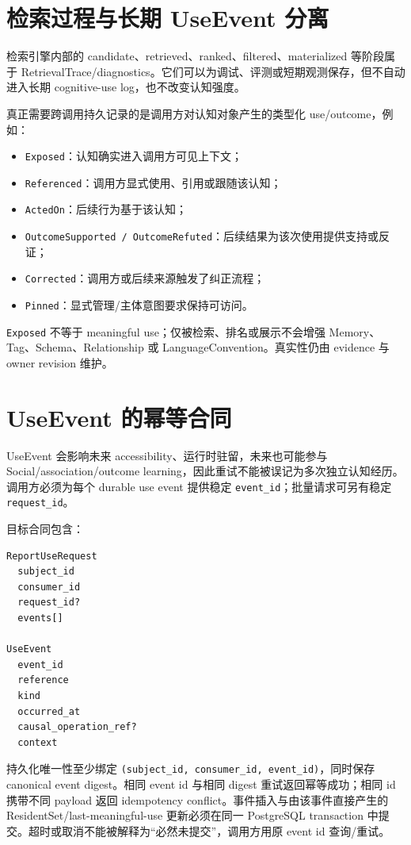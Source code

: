 \section{检索过程与长期 UseEvent 分离}

检索引擎内部的 candidate、retrieved、ranked、filtered、materialized 等阶段属于 RetrievalTrace/diagnostics。它们可以为调试、评测或短期观测保存，但不自动进入长期 cognitive-use log，也不改变认知强度。

真正需要跨调用持久记录的是调用方对认知对象产生的类型化 use/outcome，例如：

\begin{itemize}
\item \texttt{Exposed}：认知确实进入调用方可见上下文；
\item \texttt{Referenced}：调用方显式使用、引用或跟随该认知；
\item \texttt{ActedOn}：后续行为基于该认知；
\item \texttt{OutcomeSupported / OutcomeRefuted}：后续结果为该次使用提供支持或反证；
\item \texttt{Corrected}：调用方或后续来源触发了纠正流程；
\item \texttt{Pinned}：显式管理/主体意图要求保持可访问。
\end{itemize}

\texttt{Exposed} 不等于 meaningful use；仅被检索、排名或展示不会增强 Memory、Tag、Schema、Relationship 或 LanguageConvention。真实性仍由 evidence 与 owner revision 维护。

\section{UseEvent 的幂等合同}

UseEvent 会影响未来 accessibility、运行时驻留，未来也可能参与 Social/association/outcome learning，因此重试不能被误记为多次独立认知经历。调用方必须为每个 durable use event 提供稳定 \texttt{event\_id}；批量请求可另有稳定 \texttt{request\_id}。

目标合同包含：

\begin{verbatim}
ReportUseRequest
  subject_id
  consumer_id
  request_id?
  events[]

UseEvent
  event_id
  reference
  kind
  occurred_at
  causal_operation_ref?
  context
\end{verbatim}

持久化唯一性至少绑定 \texttt{(subject\_id, consumer\_id, event\_id)}，同时保存 canonical event digest。相同 event id 与相同 digest 重试返回幂等成功；相同 id 携带不同 payload 返回 idempotency conflict。事件插入与由该事件直接产生的 ResidentSet/last-meaningful-use 更新必须在同一 PostgreSQL transaction 中提交。超时或取消不能被解释为“必然未提交”，调用方用原 event id 查询/重试。

